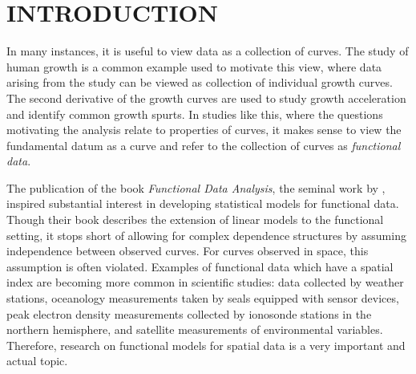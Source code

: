 
\chapter{INTRODUCTION}
In many instances, it is useful to view data as a collection of curves. The study of human growth is a common example used to motivate this view, where data arising from the study can be viewed as collection of individual growth curves.  The second derivative of the growth curves are used to study growth acceleration and identify common growth spurts. In studies like this, where the questions motivating the analysis relate to properties of curves, it makes sense to view the fundamental datum as a curve and refer to the collection of curves as \emph{functional data}.  %

The publication of the book \emph{Functional Data Analysis}, the seminal work by \cite{FDA}, inspired substantial interest in developing statistical models for functional data.  Though their book describes the extension of linear models to the functional setting, it stops short of allowing for complex dependence structures by assuming independence between observed curves. For curves observed in space, this assumption is often violated. Examples of functional data which have a spatial index are becoming more common in scientific studies: data collected by weather stations, oceanology measurements taken by seals equipped with sensor devices, peak electron density measurements collected by ionosonde stations in the northern hemisphere, and satellite measurements of environmental variables. Therefore,  research on functional models for spatial data is a very important and actual topic.


